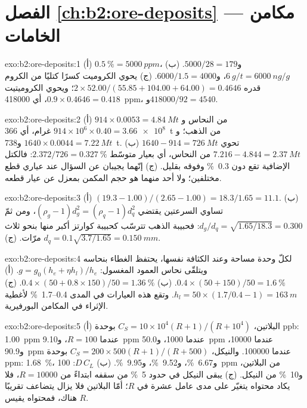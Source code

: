 \section*{الفصل \ref{ch:b2:ore-deposits} --- مكامن الخامات}

\begin{solution}{exo:b2:ore-deposits:1}
(أ) $\qty{0.5}{\percent} = \qty{5000}{ppm}$، و$5000/28 = 179$. (ب) $\qty{6}{g/t} = \qty{6000}{ng/g}$،
و$6000/1.5 = 4000$. (ج) يحوي الكروميت كسرًا كتليًا من الكروم قدره $2 \times 52.00/(55.85 + 104.00 + 64.00) = 0.4646$؛
ويحوي الكروميتيت $0.9 \times 0.4646 = 0.418$، أي \qty{418000}{ppm}،
و$418000/92 = 4540$.
\end{solution}

\begin{solution}{exo:b2:ore-deposits:2}
(أ) $914 \times 0.0053 = \qty{4.84}{Mt}$ من النحاس و$914 \times 10^6 \times 0.40 = \num{3.66e8}$ غرام،
أي \qty{366}{t} من الذهب؛ و$1640 \times 0.0044 = \qty{7.22}{Mt}$ و\qty{738}{t}. (ب) $1640 - 914 =
\qty{726}{Mt}$ تحوي $7.216 - 4.844 = \qty{2.37}{Mt}$ من النحاس، أي بعيار متوسّط
$2.372/726 = \qty{0.327}{\percent}$: فالكتل الإضافية تقع دون  \qty{0.3}{\percent}
وفوقه بقليل. (ج) إنّهما يجيبان عن السؤال عند عياري قطع مختلفين؛ ولا أحد منهما هو حجم
المكمن بمعزل عن عيار قطعه.
\end{solution}

\begin{solution}{exo:b2:ore-deposits:3}
(أ) $(19.3 - 1.00)/(2.65 - 1.00) = 18.3/1.65 = 11.1$. (ب) تساوي السرعتين يقتضي $(\rho_g - 1)d_g^2 =
(\rho_q - 1)d_q^2$، ومن ثمّ $d_g/d_q = \sqrt{1.65/18.3} = 0.300$: فحبيبة الذهب تترسّب كحبيبة كوارتز
أكبر منها بنحو ثلاث مرّات. (ج) $d_q = 0.1\sqrt{3.7/1.65} = \qty{0.150}{mm}$.
\end{solution}

\begin{solution}{exo:b2:ore-deposits:4}
لكلّ وحدة مساحة وعند الكثافة نفسها، يحتفظ الغطاء بنحاسه ويتلقّى نحاس العمود
المغسول: $g = g_0(h_e + \eta h_l)/h_e$. (أ) $0.4 \times (50 + 150)/50 = \qty{1.6}{\percent}$.
(ب) $0.4 \times (50 + 0.8 \times 150)/50 = \qty{1.36}{\percent}$. (ج) $h_l = 50 \times (1.7/0.4 - 1)
= \qty{163}{m}$. وتقع هذه العيارات في المدى 0.4--\qty{1.7}{\percent} لأغطية الإثراء في المكامن
البورفيرية.
\end{solution}

\begin{solution}{exo:b2:ore-deposits:5}
(أ) البلاتين، $C_S = 10 \times 10^4 (R + 1)/(R + 10^4)$ بوحدة \unit{ppb}: \qty{1.00}{ppm} عندما $R = 100$،
و\qty{9.10}{ppm} عندما \num{1000}، و\qty{50.0}{ppm} عندما \num{10000}، و\qty{90.9}{ppm} عندما \num{100000}.
والنيكل، $C_S = 200 \times 500 (R + 1)/(R + 500)$ بوحدة ppm: \qty{1.68}{\percent}، و\qty{6.67}{\percent}،
و\qty{9.52}{\percent}، و\qty{9.95}{\percent}. (ب) $D\,C_L$: \qty{100}{ppm} من البلاتين،
و\qty{10}{\percent} من النيكل. (ج) يبقى النيكل في حدود \qty{5}{\percent} من سقفه ابتداءً من
$R = \num{10000}$، فلا يكاد محتواه يتغيّر على مدى عامل عشرة في $R$؛ أمّا البلاتين فلا يزال
يتضاعف تقريبًا هناك، فمحتواه يقيس $R$.
\end{solution}

